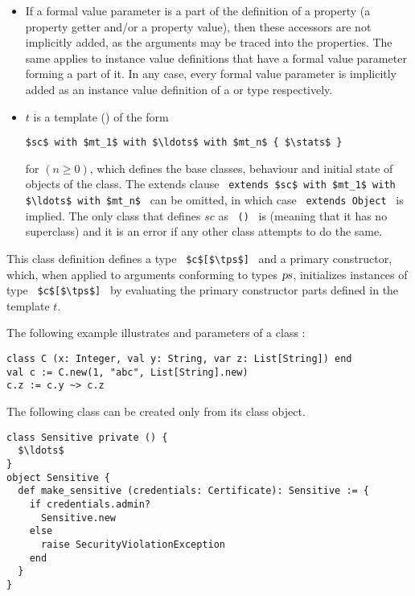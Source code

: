 \begin{itemize}
\item[]
If a formal value parameter is a part of the definition of a property (a property getter and/or a property value), then these accessors are not implicitly added, as the arguments may be traced into the properties. The same applies to instance value definitions that have a formal value parameter forming a part of it. In any case, every formal value parameter is implicitly added as an instance value definition of  a  or  type respectively. 

\item[]
$t$ is a template () of the form
\begin{lstlisting}
$sc$ with $mt_1$ with $\ldots$ with $mt_n$ { $\stats$ }
\end{lstlisting}
for $(n \geq 0)$, which defines the base classes, behaviour and initial state of objects of the class. The extends clause ~\lstinline!extends $sc$ with $mt_1$ with $\ldots$ with $mt_n$!~ can be omitted, in which case ~\lstinline!extends Object!~ is implied. The only class that defines $sc$ as ~\lstinline!()!~ is  (meaning that it has no superclass) and it is an error if any other class attempts to do the same. 

\end{itemize}

This class definition defines a type ~\lstinline!$c$[$\tps$]!~ and a primary constructor, which, when applied to arguments conforming to types $\mbox{\sl ps}$, initializes instances of type ~\lstinline!$c$[$\tps$]!~ by evaluating the primary constructor parts defined in the template $t$. 

\example The following example illustrates  and  parameters of a class : 
\begin{lstlisting}
class C (x: Integer, val y: String, var z: List[String]) end
val c := C.new(1, "abc", List[String].new)
c.z := c.y ~> c.z
\end{lstlisting}

\example The following class can be created only from its class object. 
\begin{lstlisting}
class Sensitive private () {
  $\ldots$
}
object Sensitive {
  def make_sensitive (credentials: Certificate): Sensitive := {
    if credentials.admin?
      Sensitive.new
    else 
      raise SecurityViolationException
    end
  }
}
\end{lstlisting}





